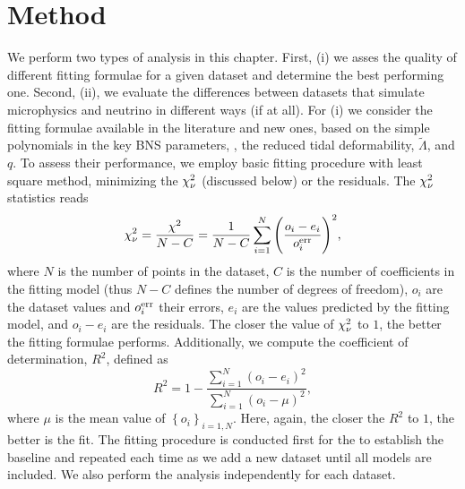 

\section{Method}

We perform two types of analysis in this chapter.
First, (i) we asses the quality of different fitting formulae for a given
dataset and determine the best performing one.
Second, (ii), we evaluate the differences between datasets that 
simulate microphysics and neutrino in different ways (if at all).
%
For (i) we consider the fitting formulae available in the literature 
and new ones, based on the simple polynomials in the key \ac{BNS} parameters, 
\ie, the reduced tidal deformability, $\tilde{\Lambda}$, and \mr{} $q$. 
%
To assess their performance, we employ basic fitting procedure with least
square method, minimizing the $\chi_{\nu}^2$ (discussed below) or the residuals.
The $\chi_{\nu}^2$ statistics reads
%
\begin{equation}
\chi_{\nu}^{2} = \frac{\chi^2}{N - C} = \frac{1}{N-C}\sum\limits_{i=1}^{N}\Bigg(\frac{o_i - e_i}{o_i ^{\rm err}}\Bigg)^2,
\label{eq:theory:chi2dof}
\end{equation}
%
where $N$ is the number of points in the dataset, $C$ is the number of coefficients 
in the fitting model (thus $N-C$ defines the number of degrees of freedom),
$o_i$ are the dataset values and $o_i ^{\rm err}$ their errors,
$e_i$ are the values predicted by the fitting model, and 
$o_i - e_i$ are the residuals.
%
The closer the value of $\chi_{\nu}^2$ to $1$, the better the fitting 
formulae performs.
%
Additionally, we compute the coefficient of determination, $R^2$,
defined as 
%
\begin{equation}
R^2 = 1 - \frac{\sum\limits_{i=1}^{N}(o_i - e_i)^2}{\sum\limits_{i=1}^{N}(o_i - \mu)^2},
\end{equation}
%
where $\mu$ is the mean value of $\left\{ o_i \right\}_{i=1,N}$.
%
Here, again, the closer the $R^2$ to $1$, the better is the fit. 
%
The fitting procedure is conducted first for the \DSrefset{} to establish
the baseline and repeated each time as we add a new dataset until all models are included.
%
We also perform the analysis independently for each dataset.
%

